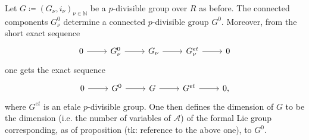 \documentclass[../Main]{subfiles}
\begin{document}
\begin{defn}
	Let $G \coloneqq \left(G_{\nu}, i_\nu\right)_{\nu \in \mathbb{N}}$ be a $p$-divisible group
	over $R$ as before.
	The connected components $G^0_\nu$ determine a connected $p$-divisible
	group $G^0$.
	Moreover, from the short exact sequence
	\begin{equation*}
	\begin{tikzcd}
		0 \arrow[r, "", rightarrow] &
		G^0_\nu \arrow[r, "", rightarrow] &
		G_\nu \arrow[r, "", rightarrow] &
		G^{et}_\nu \arrow[r, "", rightarrow] &
		0
	\end{tikzcd}
	\end{equation*}
	one gets the exact sequence
	\begin{equation*}
	\begin{tikzcd}
		0 \arrow[r, "", rightarrow] &
		G^0 \arrow[r, "", rightarrow] &
		G \arrow[r, "", rightarrow] &
		G^{et} \arrow[r, "", rightarrow] &
		0
	,\end{tikzcd}
	\end{equation*}
	where $G^{et}$ is an e\'tale $p$-divisible group.
	One then defines the dimension of $G$ to be the dimension 
	(i.e. the number of variables of $\mathscr{A}$)
	of the formal Lie group corresponding, as of proposition (tk: reference to the above one),
	to $G^0$.
\end{defn}
\end{document}
